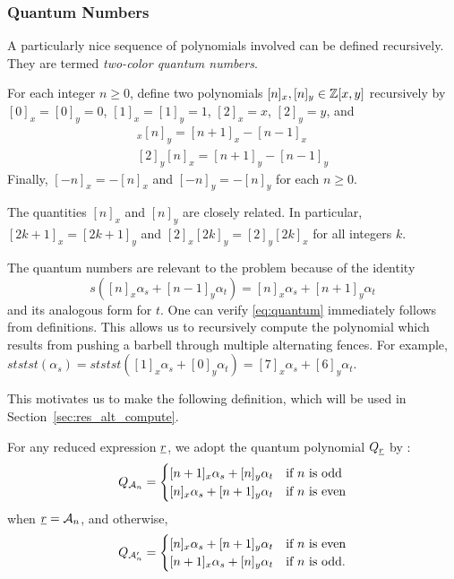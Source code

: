 \subsubsection{Quantum Numbers}
A particularly nice sequence of polynomials involved can be defined recursively.  They are termed \emph{two-color quantum numbers}.
\begin{definition*}
	For each integer $n \ge 0$, define two polynomials $[n]_x, [n]_y \in \ZZ[x,y]$ recursively by $[0]_x = [0]_y = 0$, $[1]_x = [1]_y = 1$, $[2]_x = x$, $[2]_y = y$, and
	\begin{align*}
		[2]_x[n]_y = [n+1]_x - [n-1]_x \\
		[2]_y[n]_x = [n+1]_y - [n-1]_y
	\end{align*}
	Finally, $[-n]_x = -[n]_x$ and $[-n]_y = -[n]_y$ for each $n \ge 0$.
\end{definition*}
The quantities $[n]_x$ and $[n]_y$ are closely related.  In particular, $[2k+1]_x = [2k+1]_y$ and $[2]_x[2k]_y = [2]_y[2k]_x$ for all integers $k$.

The quantum numbers are relevant to the problem because of the identity
\begin{equation}
	s([n]_x\alpha_s + [n-1]_y\alpha_t) = [n]_x\alpha_s + [n+1]_y\alpha_t
	\label{eq:quantum}
\end{equation}
and its analogous form for $t$.  One can verify \eqref{eq:quantum} immediately follows from definitions.  This allows us to recursively compute the polynomial which results from pushing a barbell through multiple alternating fences.  For example, $ststst(\alpha_s) = ststst([1]_x\alpha_s + [0]_y\alpha_t) = [7]_x\alpha_s + [6]_y\alpha_t$.

This motivates us to make the following definition, which will be used in Section~\ref{sec:res_alt_compute}.
\begin{definition*}
	For any reduced expression $\ul r$, we adopt the quantum polynomial $Q_{\ul r}$ by :
	\[
		Q_{\AA_n} = 
		\begin{cases}
			[n+1]_x \alpha_s + [n]_y \alpha_t & \text{if $n$ is odd} \\
			[n]_x \alpha_s + [n+1]_y \alpha_t & \text{if $n$ is even}
		\end{cases}
	\]
	when $\ul r = \AA_n$, and otherwise,
	\[
		Q_{\AA_n'} =
		\begin{cases}
			[n]_x \alpha_s + [n+1]_y \alpha_t & \text{if $n$ is even} \\
			[n+1]_x \alpha_s + [n]_y \alpha_t & \text{if $n$ is odd}.
		\end{cases}
	\]
\end{definition*}

